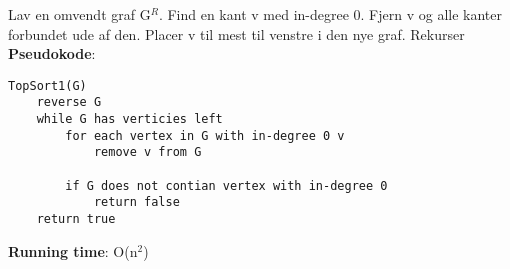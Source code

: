 Lav en omvendt graf G$^R$. Find en kant v med in-degree 0. Fjern v og alle kanter forbundet ude af den. Placer v til mest til venstre i den nye graf. Rekurser\\
\textbf{Pseudokode}:
\begin{lstlisting}[frame=single, mathescape=true]
TopSort1(G)
	reverse G
	while G has verticies left
		for each vertex in G with in-degree 0 v
			remove v from G
		
		if G does not contian vertex with in-degree 0
			return false
	return true
\end{lstlisting}
\textbf{Running time}: O(n$^2$)
